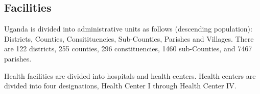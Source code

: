 \documentclass[12pt]{article} %
\begin{document}

\subsection{Facilities} %

Uganda is divided into administrative units as follows (descending population): Districts, Counties, Consitituencies, Sub-Counties, Parishes and Villages. 
There are 122 districts, 255 counties, 296 constituencies, 1460 sub-Counties, and 7467 parishes. 

Health facilities are divided into hospitals and health centers. Health centers are divided into four designations, Health Center I through Health Center IV. \cite{UBS2017}
\end{document}
